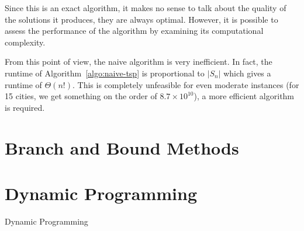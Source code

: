 Since this is an exact algorithm, it makes no sense to talk about the quality of the solutions it produces, they are always optimal. However, it is possible to assess the performance of the algorithm by examining its computational complexity.

From this point of view, the naive algorithm is very inefficient. In fact, the runtime of Algorithm~\ref{algo:naive-tsp} is proportional to \(|S_n|\) which gives a runtime of \(\Theta(n!)\). This is completely unfeasible for even moderate instances (for 15 cities, we get something on the order of \(8.7 \times 10^{10}\)), a more efficient algorithm is required.


\section{Branch and Bound Methods}



\section{Dynamic Programming}

\begin{algorithm}
    \caption{Dynamic Programming \TSP}
    \label{algo:dynamic-tsp}

    
\end{algorithm}